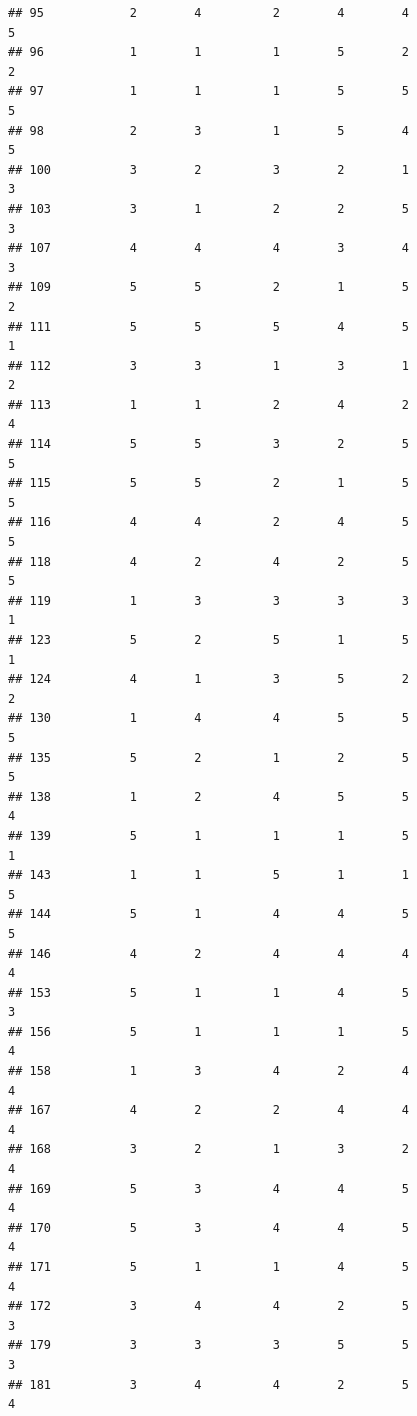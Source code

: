 \documentclass[
]{article}
\begin{document}
\begin{verbatim}
## 95            2        4          2        4        4               5
## 96            1        1          1        5        2               2
## 97            1        1          1        5        5               5
## 98            2        3          1        5        4               5
## 100           3        2          3        2        1               3
## 103           3        1          2        2        5               3
## 107           4        4          4        3        4               3
## 109           5        5          2        1        5               2
## 111           5        5          5        4        5               1
## 112           3        3          1        3        1               2
## 113           1        1          2        4        2               4
## 114           5        5          3        2        5               5
## 115           5        5          2        1        5               5
## 116           4        4          2        4        5               5
## 118           4        2          4        2        5               5
## 119           1        3          3        3        3               1
## 123           5        2          5        1        5               1
## 124           4        1          3        5        2               2
## 130           1        4          4        5        5               5
## 135           5        2          1        2        5               5
## 138           1        2          4        5        5               4
## 139           5        1          1        1        5               1
## 143           1        1          5        1        1               5
## 144           5        1          4        4        5               5
## 146           4        2          4        4        4               4
## 153           5        1          1        4        5               3
## 156           5        1          1        1        5               4
## 158           1        3          4        2        4               4
## 167           4        2          2        4        4               4
## 168           3        2          1        3        2               4
## 169           5        3          4        4        5               4
## 170           5        3          4        4        5               4
## 171           5        1          1        4        5               4
## 172           3        4          4        2        5               3
## 179           3        3          3        5        5               3
## 181           3        4          4        2        5               4

\end{verbatim}
\end{document}
